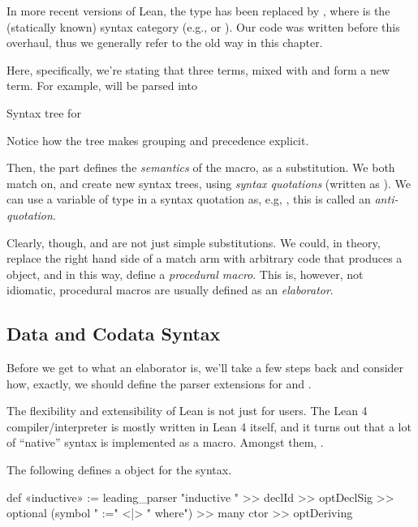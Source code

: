 \begin{remark}
    In more recent versions of Lean, the  type has been replaced by , where  is the (statically known) syntax category (e.g.,  or ).
    Our code was written before this overhaul, thus we generally refer to the old way in this chapter.
\end{remark}


Here, specifically, we're stating that three terms, mixed with  and \lean{:} form a new term. For example,  will be parsed into
\begin{todo}
    Syntax tree for 
\end{todo}
Notice how the tree makes grouping and precedence explicit.

Then, the 
part defines the \emph{semantics} of the macro, as a substitution. We both match on, and create new syntax trees, using \emph{syntax quotations} (written as ). We can use a variable of type  in a syntax quotation as, e.g, , this is called an \emph{anti-quotation}.

Clearly, though, \data{} and \codata{} are not just simple substitutions.
We could, in theory, replace the right hand side of a  match arm 
with arbitrary code that produces a  object, and in this way, define a \emph{procedural macro}.
This is, however, not idiomatic, procedural macros are usually defined as an \emph{elaborator}.


\subsection{Data and Codata Syntax}
Before we get to what an elaborator is, we'll take a few steps back and consider how, exactly, we should define the parser extensions for \data{} and \codata{}.

The flexibility and extensibility of Lean is not just for users. The Lean 4 compiler/interpreter is mostly written in Lean 4 itself, and it turns out that a lot of ``native'' syntax is implemented as a macro. Amongst them, \inductive{}.

The following defines a  object for the \inductive{} syntax.
\begin{leancode}
    def «inductive» := leading_parser "inductive " >> declId >> optDeclSig 
                        >> optional (symbol " :=" <|> " where") 
                        >> many ctor 
                        >> optDeriving
\end{leancode}

